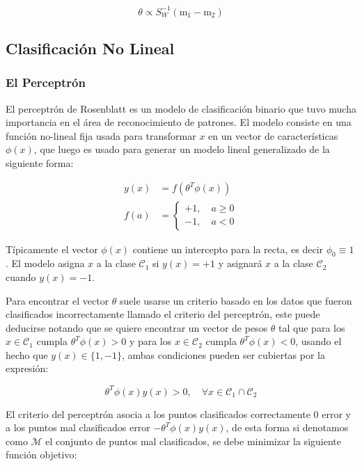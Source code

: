 \begin{equation}
    \theta \propto S_W^{-1}(\text{m}_1-\text{m}_2)
\end{equation}
\newpage
\subsection{Clasificación No Lineal}

\subsubsection{El Perceptrón}

El perceptrón de Rosenblatt es un modelo de clasificación binario que tuvo mucha importancia en el área de reconocimiento de patrones. El modelo consiste en una función no-lineal fija usada para transformar $x$ en un vector de características $\phi(x)$, que luego es usado para generar un modelo lineal generalizado de la siguiente forma:

\begin{align}
    y(x) &= f(\theta^T\phi(x))\\
    f(a) &= \left\{\begin{matrix}
    +1,\quad a\geq 0\\
    -1,\quad a<0
    \end{matrix}\right.
\end{align}

Típicamente el vector $\phi(x)$ contiene un intercepto para la recta, es decir $\phi_0\equiv1$. El modelo asigna $x$ a la clase $\mathcal{C}_1$ si $y(x)=+1$ y asignará $x$ a la clase $\mathcal{C}_2$ cuando $y(x)=-1$.

Para encontrar el vector $\theta$ suele usarse un criterio basado en los datos que fueron clasificados incorrectamente llamado el criterio del perceptrón, este puede deducirse notando que se quiere encontrar un vector de pesos $\theta$ tal que para los $x\in\mathcal{C}_1$ cumpla $\theta^T\phi(x) > 0$ y para los $x\in\mathcal{C}_2$ cumpla $\theta^T\phi(x) < 0$, usando el hecho que $y(x)\in\{1,-1\}$, ambas condiciones pueden ser cubiertas por la expresión:

$$\theta^T\phi(x)y(x) > 0,\quad \forall x \in \mathcal{C}_1\cap\mathcal{C}_2$$

El criterio del perceptrón asocia a los puntos clasificados correctamente 0 error y a los puntos mal clasificados error $-\theta^T\phi(x)y(x)$, de esta forma si denotamos como $\mathcal{M}$ el conjunto de puntos mal clasificados, se debe minimizar la siguiente función objetivo:


